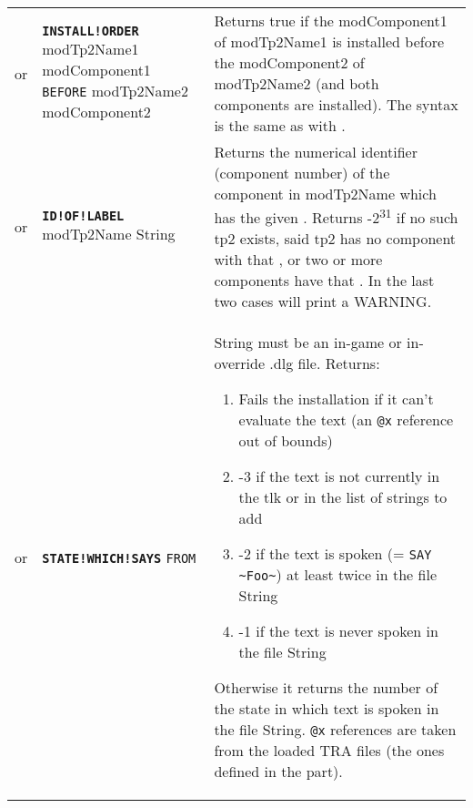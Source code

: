 \documentclass{article}
\def\ttref#1{\ahrefloc{#1}{\tt #1}}
\def\DEFINE#1{{\tt \bf #1}\label{#1}\index{#1}}
\def\DEFSYN#1{{\tt \bf #1}\index{#1}}
\def\t#1{{\tt #1}}
\begin{document}
\begin{tabular}{cp{10in}|p{10in}}
or & \DEFSYN{INSTALL!ORDER} modTp2Name1 modComponent1 \t{BEFORE} modTp2Name2 modComponent2 &
Returns true if the modComponent1 of modTp2Name1 is installed before the modComponent2
of modTp2Name2 (and both components are installed). The syntax
is the same as with \ttref {REQUIRE!COMPONENT}.  \\

or & \DEFINE{ID!OF!LABEL} modTp2Name String &
  Returns the numerical identifier (component number) of the component
  in modTp2Name which has the given \ttref{LABEL}. Returns
  -2\textsuperscript{31} if no such tp2 exists, said tp2 has no
  component with that \ttref{LABEL}, or two or more components have
  that \ttref{LABEL}. In the last two cases will print a WARNING. \\

or & \DEFINE{STATE!WHICH!SAYS} \ttref{text} \t{FROM} \ttref{String} &
  String must be an in-game or in-override .dlg file. Returns:
  \begin{enumerate}
  \item Fails the installation if it can't evaluate the text (an \t{@x} reference out of bounds)
  \item -3 if the text is not currently in the tlk or in the list of strings to add
  \item -2 if the text is spoken (= \verb+SAY ~Foo~+) at least twice in the file String
  \item -1 if the text is never spoken in the file String
  \end{enumerate}
  Otherwise it returns the number of the state in which text is spoken in the file String.
  \t{@x} references are taken from the loaded TRA files (the ones defined in the
  \ttref{Language} part).
\\


\end{tabular}
\end{document}
